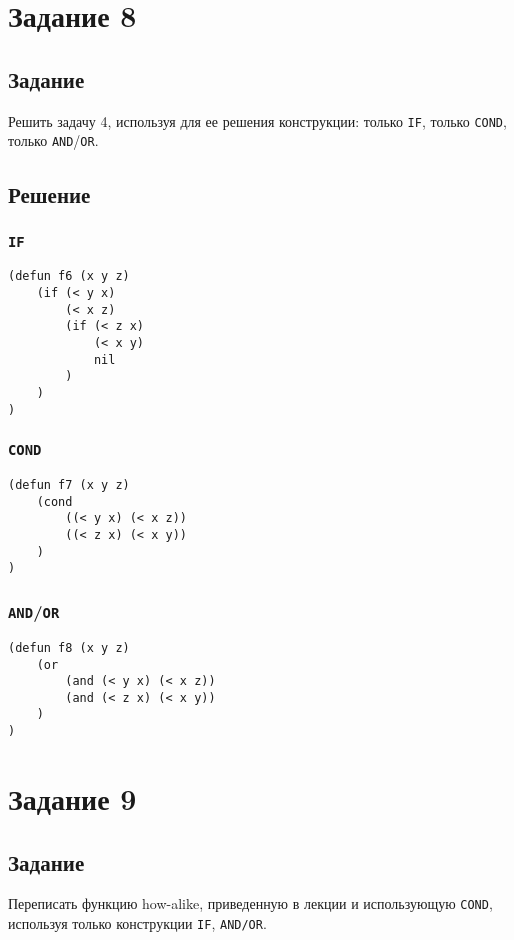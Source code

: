 \section{Задание 8}
\subsection*{Задание}
Решить задачу 4, используя для ее решения конструкции: только \texttt{IF}, только \texttt{COND}, только \texttt{AND}/\texttt{OR}.

\subsection*{Решение}
\subsubsection*{\texttt{IF}}
\begin{code}
\begin{verbatim}
(defun f6 (x y z)
	(if (< y x) 
		(< x z)
		(if (< z x)
			(< x y)
			nil
		)
	)
)
\end{verbatim}
\end{code}

\subsubsection*{\texttt{COND}}
\begin{code}
\begin{verbatim}
(defun f7 (x y z)
	(cond
		((< y x) (< x z))
		((< z x) (< x y))
	)
)
\end{verbatim}
\end{code}

\subsubsection*{\texttt{AND}/\texttt{OR}}
\begin{code}
\begin{verbatim}
(defun f8 (x y z)
	(or 
		(and (< y x) (< x z))
		(and (< z x) (< x y))
	)
)
\end{verbatim}
\end{code}


\section{Задание 9}
\subsection*{Задание}
Переписать функцию how-alike, приведенную в лекции и использующую \texttt{COND}, используя только конструкции \texttt{IF}, \texttt{AND/OR}.

